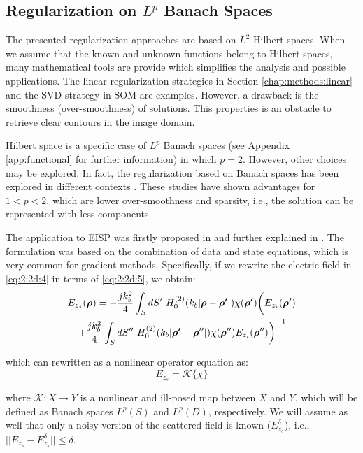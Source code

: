 		\subsection{Regularization on $L^p$ Banach Spaces}\label{chap:methods:deterministic:banach}
		
			The presented regularization approaches are based on $L^2$ Hilbert spaces. When we assume that the known and unknown functions belong to Hilbert spaces, many mathematical tools are provide which simplifies the analysis and possible applications. The linear regularization strategies in Section \ref{chap:methods:linear} and the SVD strategy in SOM are examples. However, a drawback is the smoothness (over-smoothness) of solutions. This properties is an obstacle to retrieve clear contours in the image domain.
			
			Hilbert space is a specific case of $L^p$ Banach spaces (see Appendix \ref{app:functional} for further information) in which $p=2$. However, other choices may be explored. In fact, the regularization based on Banach spaces has been explored in different contexts \citep{elad2010sparse,bach2011convex}. These studies have shown advantages for $1<p<2$, which are lower over-smoothness and sparsity, i.e., the solution can be represented with less components.
			
			The application to EISP was firstly proposed in \cite{estatico2012banach} and further explained in \cite{estatico2012novel}. The formulation was based on the combination of data and state equations, which is very common for gradient methods. Specifically, if we rewrite the electric field in \eqref{eq:2:2d:4} in terms of \eqref{eq:2:2d:5}, we obtain:
			\begin{multline}
				E_{z_s}(\boldsymbol{\rho}) = - \frac{jk_b^2}{4} \int_S dS^\prime~ H_0^{(2)}(k_b|\boldsymbol{\rho}-\boldsymbol{\rho^\prime}|)\chi(\boldsymbol{\rho^\prime}) \bigg( E_{z_i}(\boldsymbol{\rho^\prime}) \\ \left. + \frac{jk_b^2}{4}\int_S dS^{\prime\prime}~ H^{(2)}_0(k_b|\boldsymbol{\rho^\prime}-\boldsymbol{\rho}^{\prime\prime}|)\chi(\boldsymbol{\rho}^{\prime\prime}) E_{z_i}(\boldsymbol{\rho}^{\prime\prime}) \right)^{-1} \label{eq:3:deterministic:banach:generalequation}
			\end{multline}
			
			\noindent which can rewritten as a nonlinear operator equation as:
			\begin{equation}
				E_{z_s} = \mathcal{K}\{\chi\} \label{eq:3:deterministic:banach:operatorequation}
			\end{equation}
		
			\noindent where $\mathcal{K} : X \rightarrow Y$ is a nonlinear and ill-posed map between $X$ and $Y$, which will be defined as Banach spaces $L^p(S)$ and $L^p(D)$, respectively. We will assume as well that only a noisy version of the scattered field is known ($E_{z_s}^\delta$), i.e., $||E_{z_s}-E_{z_s}^\delta|| \le \delta$.
			

